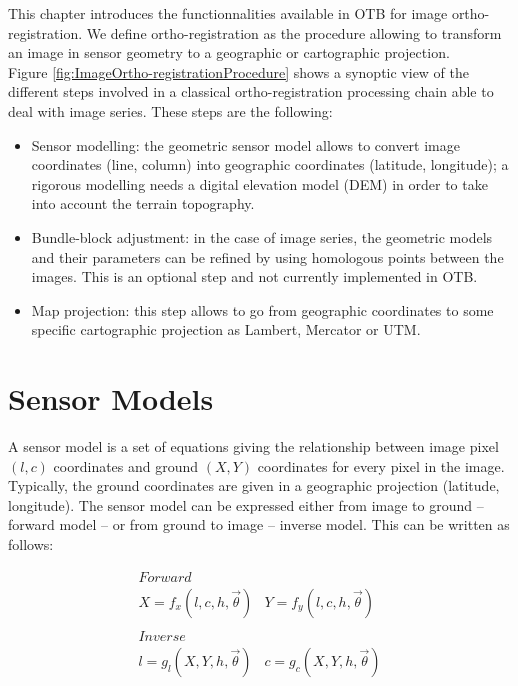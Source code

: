 This chapter introduces the functionnalities available in OTB for
image ortho-registration. We define ortho-registration as the
procedure allowing to transform an image in sensor geometry to a
geographic or cartographic projection.\\

Figure \ref{fig:ImageOrtho-registrationProcedure} shows a synoptic
view of the different steps involved in a classical ortho-registration
processing chain able to deal with image series. These steps are the following:
\begin{itemize}
  \item Sensor modelling: the geometric sensor model allows to convert
  image coordinates (line, column) into geographic coordinates
  (latitude, longitude); a rigorous modelling needs a digital
  elevation model (DEM) in order to take into account the terrain
  topography.
  \item Bundle-block adjustment: in the case of image series, the
  geometric models and their parameters can be refined by using
  homologous points between the images. This is an optional step and
  not currently implemented in OTB.
  \item Map projection: this step allows to go from geographic
  coordinates to some specific cartographic projection as Lambert,
  Mercator or UTM.
\end{itemize}


\section{Sensor Models}
\ifitkFullVersion
\label{sec:SensorModels}
\fi

A sensor model is a set of equations giving the relationship between
image pixel $(l,c)$ coordinates and ground $(X,Y)$ coordinates for every
pixel in the image. Typically, the ground coordinates are given in a
geographic projection (latitude, longitude). The sensor model
can be expressed either from image to ground -- forward model -- or
from ground to image -- inverse model. This can be written as follows:

\begin{displaymath}
  \begin{array}{cc}
    Forward & \\
    X = f_x(l,c,h,\vec\theta) & Y = f_y(l,c,h,\vec\theta)\\
     & \\
    Inverse & \\
    l = g_l(X,Y,h,\vec\theta) & c = g_c(X,Y,h,\vec\theta)
  \end{array}
\end{displaymath}

